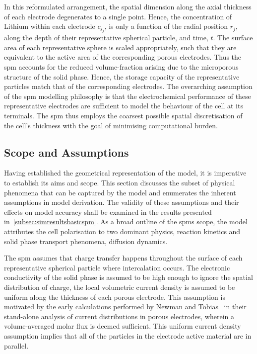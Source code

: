 In  this  reformulated  arrangement,  the  spatial  dimension  along  the  axial
thickness  of  each  electrode  degenerates   to  a  single  point.  Hence,  the
concentration of Lithium within each electrode $c_{\text{s}_j}$, \jinnegpos{} is
only a  function of the radial  position $r_j$, \jinnegpos{} along  the depth of
their representative spherical particle, and time, $t$. The surface area of each
representative sphere is scaled appropriately,  such that they are equivalent to
the  active area  of the  corresponding  porous electrodes.  Thus the  \gls{spm}
accounts  for  the  reduced  volume-fraction  arising  due  to  the  microporous
structure of the solid phase. Hence,  the storage capacity of the representative
particles match that of the corresponding electrodes. The overarching assumption
of the \gls{spm} modelling philosophy is that the electrochemical performance of
these representative  electrodes are  sufficient to model  the behaviour  of the
cell at its terminals. The \gls{spm}  thus employs the coarsest possible spatial
discretisation of the cell's thickness with the goal of minimising computational
burden.


\subsection{Scope and Assumptions}\label{subsec:basicspmassumptions}

Having established the geometrical representation of the model, it is imperative
to  establish  its  aims  and  scope.  This  section  discusses  the  subset  of
physical  phenomena  that can  be  captured  by  the  model and  enumerates  the
inherent assumptions in model derivation.  The validity of these assumptions and
their  effects on  model accuracy  shall be  examined in  the results  presented
in~\cref{subsec:simresultsbasicspm}.  As  a  broad outline  of  the  \glspl{spm}
scope,  the model  attributes the  cell  polarisation to  two dominant  physics,
\viz{} reaction  kinetics and solid  phase transport phenomena,  \ie{} diffusion
dynamics.


The  \gls{spm}  assumes that  charge  transfer  happens throughout  the  surface
of  each  representative  spherical  particle where  intercalation  occurs.  The
electronic  conductivity of  the solid  phase is  assumed to  be high  enough to
ignore the  spatial distribution of  charge, \ie{} the local  volumetric current
density is assumed  to be uniform along the thickness  of each porous electrode.
This assumption is  motivated by the early calculations performed  by Newman and
Tobias~\cite{Newman1962} in their stand-alone  analysis of current distributions
in porous electrodes, wherein a volume-averaged molar flux is deemed sufficient.
This uniform current density assumption implies that all of the particles in the
electrode active material are in parallel.


